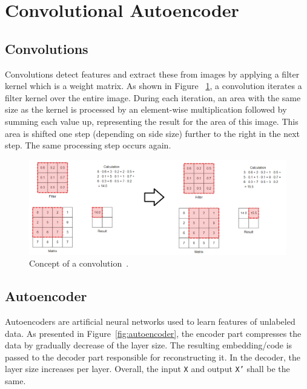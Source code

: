 \documentclass[a4paper,12pt, listof=totoc,toc=sectionentrywithdots]{scrartcl}
\begin{document}
\section{Convolutional Autoencoder}

\subsection{Convolutions}

Convolutions detect features and extract these from images by applying a filter kernel which is a weight matrix.
As shown in Figure ~\ref{fig:convolution}, a convolution iterates a filter kernel over the entire image.
During each iteration, an area with the same size as the kernel is processed by an element-wise multiplication followed by summing each value up, representing the result for the area of this image.
This area is shifted one step (depending on side size) further to the right in the next step. 
The same processing step occurs again.

\begin{figure}[h]
\centering
        \includegraphics[totalheight=5cm]{Figures/convolution.png}
    \caption{Concept of a convolution~\cite{ConvolutionAnimation}.}
    \label{fig:convolution}
\end{figure}


\subsection{Autoencoder}

Autoencoders are artificial neural networks used to learn features of unlabeled data.
As presented in Figure~\ref{fig:autoencoder}, the encoder part compresses the data by gradually decrease of the layer size.
The resulting embedding/code is passed to the decoder part responsible for
reconstructing it.
In the decoder, the layer size increases per layer.
Overall, the input \texttt{X} and output \texttt{X'} shall be the same.
\end{document}

